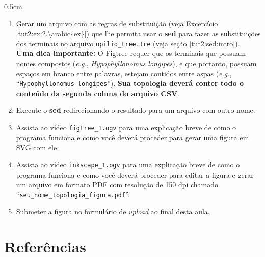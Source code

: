 \begin{refsection}
\begin {myindentpar}{0.5cm}
\begin{enumerate}[\itshape a.]
 \item{Gerar um arquivo com as regras de substituição (veja Excercício \ref{tut2:ex:2.\arabic{ex}}) que lhe permita usar o \textbf{sed} para fazer as substituições dos terminais no arquivo \texttt{opilio\_tree.tre} (veja seção \ref{tut2:sed:intro})}.\\
\textbf{Uma dica importante:} O Figtree requer que os terminais que possuam nomes compostos (\textit{e.g.}, \textit{Hypophyllonomus longipes}), e que portanto, possuam espaços em branco entre palavras, estejam contidos entre aspas (\textit{e.g.}, ``\texttt{Hypophyllonomus longipes}''). \textbf{Sua topologia deverá conter todo o conteúdo da segunda coluna do arquivo CSV}.\\
 \item{Execute o \textbf{sed} redirecionando o resultado para um arquivo com outro nome}.\\
 \item{Assista ao vídeo \texttt{figtree\_1.ogv} para uma explicação breve de como o programa funciona e como você deverá proceder para gerar uma figura em SVG com ele}.\\
 \item{Assista ao vídeo \texttt{inkscape\_1.ogv} para uma explicação breve de como o programa funciona e como você deverá proceder para editar a figura e gerar um arquivo em formato PDF com resolução de 150 dpi chamado ``\texttt{seu\_nome\_topologia\_figura.pdf}''}.\\
 \item{Submeter a figura no formulário de \href{https://goo.gl/forms/5Kj9YGBjJLXf9Z6k1}{\textit{upload}}} ao final desta aula.\\


\end{enumerate}
\end{myindentpar}




\section{Referências}\label{tut2:refs}
\printbibliography[heading=none]
\end{refsection}
%


